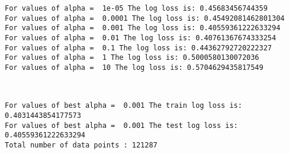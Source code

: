 \documentclass[11pt]{article}
\begin{document}
    \begin{Verbatim}[commandchars=\\\{\}]
For values of alpha =  1e-05 The log loss is: 0.45683456744359
For values of alpha =  0.0001 The log loss is: 0.45492081462801304
For values of alpha =  0.001 The log loss is: 0.40559361222633294
For values of alpha =  0.01 The log loss is: 0.40761367674333254
For values of alpha =  0.1 The log loss is: 0.44362792720222327
For values of alpha =  1 The log loss is: 0.5000580130072036
For values of alpha =  10 The log loss is: 0.5704629435817549

    \end{Verbatim}

    \begin{center}
    \end{center}
    { \hspace*{\fill} \\}
    
    \begin{Verbatim}[commandchars=\\\{\}]
For values of best alpha =  0.001 The train log loss is: 0.4031443854177573
For values of best alpha =  0.001 The test log loss is: 0.40559361222633294
Total number of data points : 121287

    \end{Verbatim}

    \begin{center}
    \end{center}
    { \hspace*{\fill} \\}
    
\end{document}
